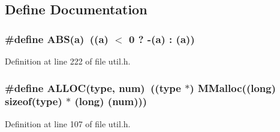 \subsection{Define Documentation}
\subsubsection{\setlength{\rightskip}{0pt plus 5cm}\#define ABS(a)~((a) $<$ 0 ? -(a) : (a))}\label{util_8h_e2f08dc603ae93c402abd918ba4e23e1}




Definition at line 222 of file util.h.
\subsubsection{\setlength{\rightskip}{0pt plus 5cm}\#define ALLOC(type, num)~((type $\ast$) MMalloc((long) sizeof(type) $\ast$ (long) (num)))}\label{util_8h_21755cdb11c76954a33c653579810f3a}




Definition at line 107 of file util.h.

